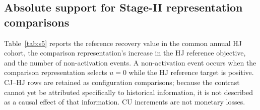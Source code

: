 \documentclass[10pt,a4paper]{article}
\numberwithin{equation}{section}
\begin{document}
\subsection{Absolute support for Stage-II representation comparisons}
Table~\ref{tab:s5} reports the reference recovery value in the common annual HJ cohort, the comparison representation's increase in the HJ reference objective, and the number of non-activation events. A non-activation event occurs when the comparison representation selects $u=0$ while the HJ reference target is positive. CJ--HJ rows are retained as configuration comparisons; because the contrast cannot yet be attributed specifically to historical information, it is not described as a causal effect of that information. CU increments are not monetary losses.

\setlength{\tabcolsep}{3pt}
\small
\end{document}

